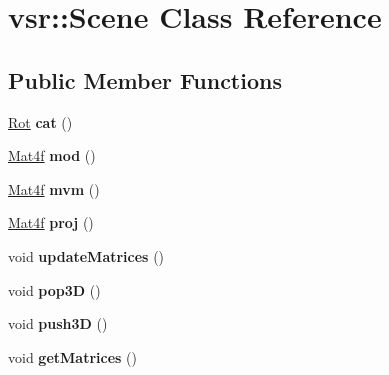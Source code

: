 \hypertarget{classvsr_1_1_scene}{\section{vsr\-:\-:Scene Class Reference}
\label{classvsr_1_1_scene}
}
\subsection*{Public Member Functions}
\begin{DoxyCompactItemize}
\item 
\hypertarget{classvsr_1_1_scene_a9505a4ce330abb368b37ede65ddcdb42}{\hyperlink{namespacevsr_aa1af5d33b552dd31499209a8f68548e8}{Rot} {\bfseries cat} ()}\label{classvsr_1_1_scene_a9505a4ce330abb368b37ede65ddcdb42}

\item 
\hypertarget{classvsr_1_1_scene_a32867fa0e64fa5b8ef8ed4f046df4774}{\hyperlink{classvsr_1_1_mat4}{Mat4f} {\bfseries mod} ()}\label{classvsr_1_1_scene_a32867fa0e64fa5b8ef8ed4f046df4774}

\item 
\hypertarget{classvsr_1_1_scene_af613cde517b1bed3ec06a9b2248753ea}{\hyperlink{classvsr_1_1_mat4}{Mat4f} {\bfseries mvm} ()}\label{classvsr_1_1_scene_af613cde517b1bed3ec06a9b2248753ea}

\item 
\hypertarget{classvsr_1_1_scene_a6a5cff70ba118c59be5ac6556cc8ee65}{\hyperlink{classvsr_1_1_mat4}{Mat4f} {\bfseries proj} ()}\label{classvsr_1_1_scene_a6a5cff70ba118c59be5ac6556cc8ee65}

\item 
\hypertarget{classvsr_1_1_scene_ab23fdd07ddca791f000022538f4619ef}{void {\bfseries update\-Matrices} ()}\label{classvsr_1_1_scene_ab23fdd07ddca791f000022538f4619ef}

\item 
\hypertarget{classvsr_1_1_scene_a971ac35c28640ce497beee2d459358db}{void {\bfseries pop3\-D} ()}\label{classvsr_1_1_scene_a971ac35c28640ce497beee2d459358db}

\item 
\hypertarget{classvsr_1_1_scene_a5de1dddf814318f613bf5a092ab9dcea}{void {\bfseries push3\-D} ()}\label{classvsr_1_1_scene_a5de1dddf814318f613bf5a092ab9dcea}

\item 
\hypertarget{classvsr_1_1_scene_ad3b0ac7c02b40541adc569c4323d1db0}{void {\bfseries get\-Matrices} ()}\label{classvsr_1_1_scene_ad3b0ac7c02b40541adc569c4323d1db0}

\end{DoxyCompactItemize}
